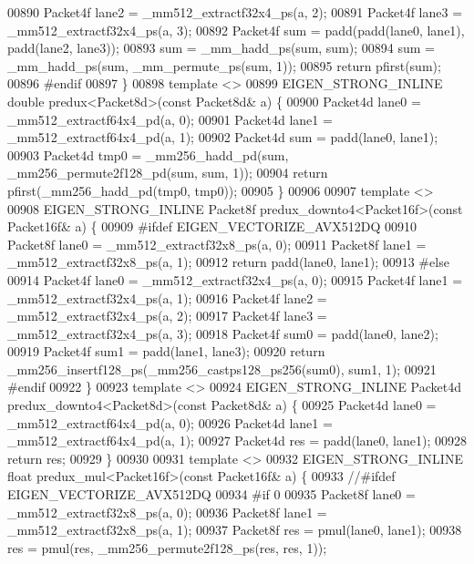 \begin{DoxyCode}
00890   Packet4f lane2 = \_mm512\_extractf32x4\_ps(a, 2);
00891   Packet4f lane3 = \_mm512\_extractf32x4\_ps(a, 3);
00892   Packet4f sum = padd(padd(lane0, lane1), padd(lane2, lane3));
00893   sum = \_mm\_hadd\_ps(sum, sum);
00894   sum = \_mm\_hadd\_ps(sum, \_mm\_permute\_ps(sum, 1));
00895   \textcolor{keywordflow}{return} pfirst(sum);
00896 \textcolor{preprocessor}{#endif}
00897 \}
00898 \textcolor{keyword}{template} <>
00899 EIGEN\_STRONG\_INLINE \textcolor{keywordtype}{double} predux<Packet8d>(\textcolor{keyword}{const} Packet8d& a) \{
00900   Packet4d lane0 = \_mm512\_extractf64x4\_pd(a, 0);
00901   Packet4d lane1 = \_mm512\_extractf64x4\_pd(a, 1);
00902   Packet4d sum = padd(lane0, lane1);
00903   Packet4d tmp0 = \_mm256\_hadd\_pd(sum, \_mm256\_permute2f128\_pd(sum, sum, 1));
00904   \textcolor{keywordflow}{return} pfirst(\_mm256\_hadd\_pd(tmp0, tmp0));
00905 \}
00906 
00907 \textcolor{keyword}{template} <>
00908 EIGEN\_STRONG\_INLINE Packet8f predux\_downto4<Packet16f>(\textcolor{keyword}{const} Packet16f& a) \{
00909 \textcolor{preprocessor}{#ifdef EIGEN\_VECTORIZE\_AVX512DQ}
00910   Packet8f lane0 = \_mm512\_extractf32x8\_ps(a, 0);
00911   Packet8f lane1 = \_mm512\_extractf32x8\_ps(a, 1);
00912   \textcolor{keywordflow}{return} padd(lane0, lane1);
00913 \textcolor{preprocessor}{#else}
00914   Packet4f lane0 = \_mm512\_extractf32x4\_ps(a, 0);
00915   Packet4f lane1 = \_mm512\_extractf32x4\_ps(a, 1);
00916   Packet4f lane2 = \_mm512\_extractf32x4\_ps(a, 2);
00917   Packet4f lane3 = \_mm512\_extractf32x4\_ps(a, 3);
00918   Packet4f sum0 = padd(lane0, lane2);
00919   Packet4f sum1 = padd(lane1, lane3);
00920   \textcolor{keywordflow}{return} \_mm256\_insertf128\_ps(\_mm256\_castps128\_ps256(sum0), sum1, 1);
00921 \textcolor{preprocessor}{#endif}
00922 \}
00923 \textcolor{keyword}{template} <>
00924 EIGEN\_STRONG\_INLINE Packet4d predux\_downto4<Packet8d>(\textcolor{keyword}{const} Packet8d& a) \{
00925   Packet4d lane0 = \_mm512\_extractf64x4\_pd(a, 0);
00926   Packet4d lane1 = \_mm512\_extractf64x4\_pd(a, 1);
00927   Packet4d res = padd(lane0, lane1);
00928   \textcolor{keywordflow}{return} res;
00929 \}
00930 
00931 \textcolor{keyword}{template} <>
00932 EIGEN\_STRONG\_INLINE \textcolor{keywordtype}{float} predux\_mul<Packet16f>(\textcolor{keyword}{const} Packet16f& a) \{
00933 \textcolor{comment}{//#ifdef EIGEN\_VECTORIZE\_AVX512DQ}
00934 \textcolor{preprocessor}{#if 0}
00935   Packet8f lane0 = \_mm512\_extractf32x8\_ps(a, 0);
00936   Packet8f lane1 = \_mm512\_extractf32x8\_ps(a, 1);
00937   Packet8f res = pmul(lane0, lane1);
00938   res = pmul(res, \_mm256\_permute2f128\_ps(res, res, 1));

\end{DoxyCode}
